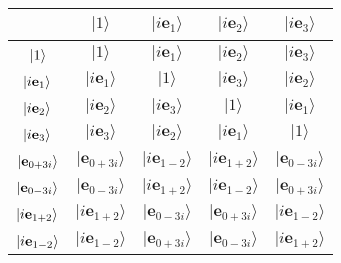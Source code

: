 \documentclass[11pt,twocolumn]{article}
\newcommand\T{\rule{0pt}{2.6ex}}
\begin{document}
\begin{table}
\footnotesize
\begin{center}
\begin{tabular}{|c||c|c|c|c|}
\hline
\ & $|1\rangle$\T & $|i\mathbf e_1\rangle$ & $|i\mathbf e_2\rangle$ & $|i\mathbf e_3\rangle$\\
\hline\hline
$\T|1\rangle$ & $|1\rangle$ & $|i\mathbf e_1\rangle$ & $|i\mathbf e_2\rangle$ & $|i\mathbf e_3\rangle$\\
\hline
$\T|i\mathbf e_1\rangle$ & $|i\mathbf e_1\rangle$ & $|1\rangle$ & $|i\mathbf e_3\rangle$ & $|i\mathbf e_2\rangle$\\
\hline
$\T|i\mathbf e_2\rangle$ & $|i\mathbf e_2\rangle$ & $|i\mathbf e_3\rangle$ & $|1\rangle$ & $|i\mathbf e_1\rangle$\\
\hline
$\T|i\mathbf e_3\rangle$ & $|i\mathbf e_3\rangle$ & $|i\mathbf e_2\rangle$ & $|i\mathbf e_1\rangle$ & $|1\rangle$\\
\hline
$\T|\mathbf e_{0+3i}\rangle$ & $|\mathbf e_{0+3i}\rangle$ & $|i\mathbf e_{1-2}\rangle$ & $|i\mathbf e_{1+2}\rangle$ & $|\mathbf e_{0-3i}\rangle$\\
\hline
$\T|\mathbf e_{0-3i}\rangle$ & $|\mathbf e_{0-3i}\rangle$ & $|i\mathbf e_{1+2}\rangle$ & $|i\mathbf e_{1-2}\rangle$ & $|\mathbf e_{0+3i}\rangle$\\
\hline
$\T|i\mathbf e_{1+2}\rangle$ & $|i\mathbf e_{1+2}\rangle$ & $|\mathbf e_{0-3i}\rangle$ & $|\mathbf e_{0+3i}\rangle$ & $|i\mathbf e_{1-2}\rangle$\\
\hline
$\T|i\mathbf e_{1-2}\rangle$ & $|i\mathbf e_{1-2}\rangle$ & $|\mathbf e_{0+3i}\rangle$ & $|\mathbf e_{0-3i}\rangle$ & $|i\mathbf e_{1+2}\rangle$\\
\hline
\end{tabular}
\bigskip


\end{center}
\end{table}
\end{document}
